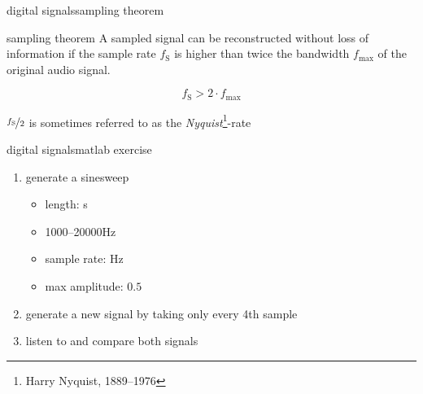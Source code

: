         \begin{frame}{digital signals}{sampling theorem}
            \toremember{}
            
            \begin{block}{sampling theorem}
                A sampled signal can be reconstructed without loss of information if the sample rate $f_\mathrm{S}$ is higher than twice the bandwidth $f_\mathrm{max}$ of the original audio signal.
                
                \begin{equation*}
                    f_\mathrm{S} > 2\cdot f_\mathrm{max}
                \end{equation*}
            \end{block}
            
            \pause
            \bigskip
            $\nicefrac{f_\mathrm{S}}{2}$ is sometimes referred to as the \textit{Nyquist}\footnote{\tiny Harry Nyquist, 1889--1976}-rate
        \end{frame}	

        \begin{frame}{digital signals}{matlab exercise}
            
            \begin{enumerate}
                \item   generate a sinesweep
                    \begin{itemize}
                        \item   length: \unit[5]{s}
                        \item   1000--20000\unit{Hz}
                        \item   sample rate: \unit[48000]{Hz}
                        \item   max amplitude: $0.5$
                    \end{itemize}
                \item   generate a new signal by taking only every 4th sample
                \item   listen to and compare both signals
            \end{enumerate}
        \end{frame}
            

